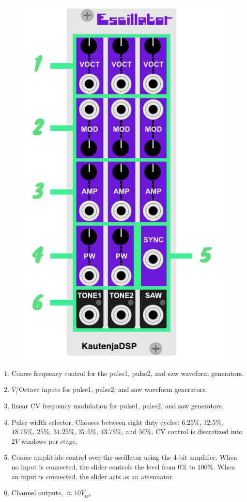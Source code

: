 \documentclass[12pt,letter]{article}
\begin{document}
\begin{figure}[!htp]
\centering
\includegraphics{Escillator-Manual}
\end{figure}

\begin{enumerate}
  \item Coarse frequency control for the pulse1, pulse2, and saw waveform generators.
  \item $V$/Octave inputs for pulse1, pulse2, and saw waveform generators.
  \item linear CV frequency modulation for pulse1, pulse2, and saw generators.
  \item Pulse width selector. Chooses between eight duty cycles: $6.25\%$, $12.5\%$, $18.75\%$, $25\%$, $31.25\%$, $37.5\%$, $43.75\%$, and $50\%$. CV control is discretized into $2V$ windows per stage.
  \item Coarse amplitude control over the oscillator using the 4-bit amplifier. When no input is connected, the slider controls the level from $0\%$ to $100\%$. When an input is connected, the slider acts as an attenuator.
  \item Channel outputs, ${\approx}10V_{pp}$.
\end{enumerate}


\clearpage
\renewcommand\refname{References \& Acknowledgments}
\nocite{*}


\end{document}
